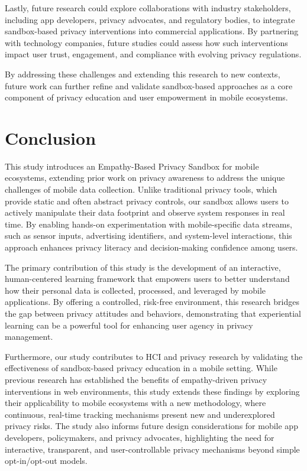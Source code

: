 \documentclass[acmlarge, nonacm]{acmart}
\begin{document}
Lastly, future research could explore collaborations with industry stakeholders, including app developers, privacy advocates, and regulatory bodies, to integrate sandbox-based privacy interventions into commercial applications. By partnering with technology companies, future studies could assess how such interventions impact user trust, engagement, and compliance with evolving privacy regulations.

By addressing these challenges and extending this research to new contexts, future work can further refine and validate sandbox-based approaches as a core component of privacy education and user empowerment in mobile ecosystems.

\section{Conclusion}

This study introduces an Empathy-Based Privacy Sandbox for mobile ecosystems, extending prior work on privacy awareness to address the unique challenges of mobile data collection. Unlike traditional privacy tools, which provide static and often abstract privacy controls, our sandbox allows users to actively manipulate their data footprint and observe system responses in real time. By enabling hands-on experimentation with mobile-specific data streams, such as sensor inputs, advertising identifiers, and system-level interactions, this approach enhances privacy literacy and decision-making confidence among users.

The primary contribution of this study is the development of an interactive, human-centered learning framework that empowers users to better understand how their personal data is collected, processed, and leveraged by mobile applications. By offering a controlled, risk-free environment, this research bridges the gap between privacy attitudes and behaviors, demonstrating that experiential learning can be a powerful tool for enhancing user agency in privacy management.

Furthermore, our study contributes to HCI and privacy research by validating the effectiveness of sandbox-based privacy education in a mobile setting. While previous research has established the benefits of empathy-driven privacy interventions in web environments, this study extends these findings by exploring their applicability to mobile ecosystems with a new methodology, where continuous, real-time tracking mechanisms present new and underexplored privacy risks. The study also informs future design considerations for mobile app developers, policymakers, and privacy advocates, highlighting the need for interactive, transparent, and user-controllable privacy mechanisms beyond simple opt-in/opt-out models.
\end{document}
